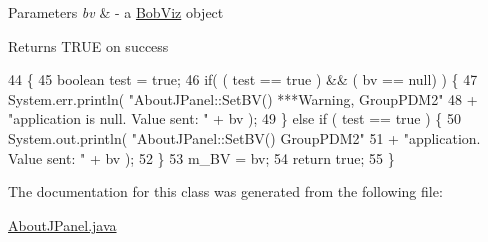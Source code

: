 \begin{DoxyParams}{Parameters}
{\em bv} & -\/ a \hyperlink{class_bob_viz}{Bob\-Viz} object \\
\hline
\end{DoxyParams}
\begin{DoxyReturn}{Returns}
T\-R\-U\-E on success 
\end{DoxyReturn}

\begin{DoxyCode}
44                                       \{
45         \textcolor{keywordtype}{boolean} test = \textcolor{keyword}{true};
46         \textcolor{keywordflow}{if}( ( test == \textcolor{keyword}{true} ) && ( bv == null) ) \{
47             System.err.println( \textcolor{stringliteral}{"AboutJPanel::SetBV() ***Warning, GroupPDM2"}
48                     + \textcolor{stringliteral}{"application is null. Value sent: "} + bv );
49         \} \textcolor{keywordflow}{else} \textcolor{keywordflow}{if} ( test == \textcolor{keyword}{true} ) \{
50             System.out.println( \textcolor{stringliteral}{"AboutJPanel::SetBV() GroupPDM2"}
51                     + \textcolor{stringliteral}{"application. Value sent: "} + bv );
52         \}
53         m\_BV = bv;
54         \textcolor{keywordflow}{return} \textcolor{keyword}{true};
55     \}
\end{DoxyCode}


The documentation for this class was generated from the following file\-:\begin{DoxyCompactItemize}
\item 
\hyperlink{_about_j_panel_8java}{About\-J\-Panel.\-java}\end{DoxyCompactItemize}
